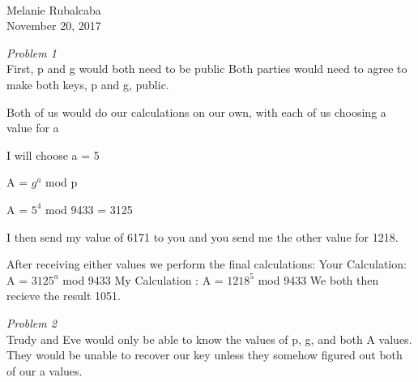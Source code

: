 \documentclass[11pt]{article}
\begin{document}
\\

Melanie Rubalcaba\\
November 20, 2017

\begin{flushleft}

\textit{Problem 1}\\

First, p and g would both need to be public
Both parties would need to agree to make both keys, p and g, public.

Both of us would do our calculations on our own, with each of us choosing a value for a

I will choose a = 5

A = $g^a$ mod p

A = $5^4$ mod 9433 = 3125

I then send my value of 6171 to you and you send me the other value for 1218.

After receiving either values we perform the final calculations:
Your Calculation: A = $3125^a$ mod 9433
My  Calculation : A = $1218^5$ mod 9433
We both then recieve the result 1051.

\textit{Problem 2}\\
Trudy and Eve would only be able to know the values of p, g, and both A values.\\

They would be unable to recover our key unless they somehow figured out both of our a values.


\end{flushleft}
\end{document}
